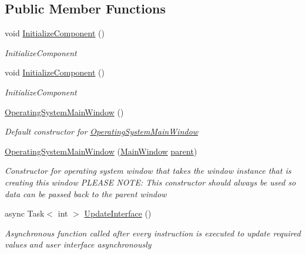 \subsection*{Public Member Functions}
\begin{DoxyCompactItemize}
\item 
void \hyperlink{class_c_p_u___o_s___simulator_1_1_operating_system_main_window_abf657079159db7bb54ea7089f5b7b5db}{Initialize\+Component} ()
\begin{DoxyCompactList}\small\item\em Initialize\+Component \end{DoxyCompactList}\item 
void \hyperlink{class_c_p_u___o_s___simulator_1_1_operating_system_main_window_abf657079159db7bb54ea7089f5b7b5db}{Initialize\+Component} ()
\begin{DoxyCompactList}\small\item\em Initialize\+Component \end{DoxyCompactList}\item 
\hyperlink{class_c_p_u___o_s___simulator_1_1_operating_system_main_window_a6ebb63e5bf2709cb0281434c651845dc}{Operating\+System\+Main\+Window} ()
\begin{DoxyCompactList}\small\item\em Default constructor for \hyperlink{class_c_p_u___o_s___simulator_1_1_operating_system_main_window}{Operating\+System\+Main\+Window} \end{DoxyCompactList}\item 
\hyperlink{class_c_p_u___o_s___simulator_1_1_operating_system_main_window_a2e4a26004957e2b1f1c4376f0a6656ab}{Operating\+System\+Main\+Window} (\hyperlink{class_c_p_u___o_s___simulator_1_1_main_window}{Main\+Window} \hyperlink{class_c_p_u___o_s___simulator_1_1_operating_system_main_window_a0219ba1583d00852bea36ac27c9d878d}{parent})
\begin{DoxyCompactList}\small\item\em Constructor for operating system window that takes the window instance that is creating this window P\+L\+E\+A\+S\+E N\+O\+T\+E\+: This constructor should always be used so data can be passed back to the parent window \end{DoxyCompactList}\item 
async Task$<$ int $>$ \hyperlink{class_c_p_u___o_s___simulator_1_1_operating_system_main_window_a365c0f87c8e59dc4ce9cc33ce52bf50e}{Update\+Interface} ()
\begin{DoxyCompactList}\small\item\em Asynchronous function called after every instruction is executed to update required values and user interface asynchronously \end{DoxyCompactList}\end{DoxyCompactItemize}
